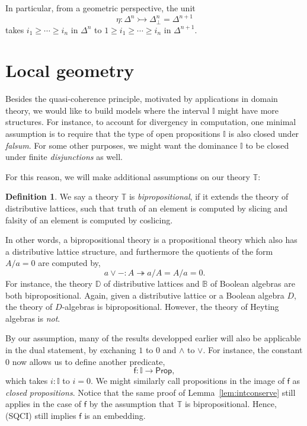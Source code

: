 \documentclass[12pt]{amsart}
\theoremstyle{definition}
\newtheorem{definition}[theorem]{Definition}
\newcommand{\mbb}[1]{\mathbb{#1}}
\newcommand{\T}{\mbb T}
\newcommand{\I}{\mbb I}
\newcommand{\ms}[1]{\mathsf{#1}}
\newcommand{\surj}{\twoheadrightarrow}
\newcommand{\inj}{\rightarrowtail}
\newcommand{\prt}{_{\bot}}
\newcommand{\pp}{\ms{Prop}}
\begin{document}
In particular, from a geometric perspective, the unit
\[ \eta : \Delta^n \inj \Delta^n\prt = \Delta^{n+1} \]
takes $i_1 \ge \cdots \ge i_n$ in $\Delta^n$ to $1 \ge i_1 \ge \cdots \ge i_n$ in $\Delta^{n+1}$. 

\section{Local geometry}\label{sec:nullstellensatz_and_local_geometry}

Besides the quasi-coherence principle, motivated by applications in domain theory, we would like to build models where the interval $\I$ might have more structures. For instance, to account for divergency in computation, one minimal assumption is to require that the type of open propositions $\I$ is also closed under \emph{falsum}. For some other purposes, we might want the dominance $\I$ to be closed under finite \emph{disjunctions} as well.

For this reason, we will make additional assumptions on our theory $\T$:

\begin{definition}
  We say a theory $\T$ is \emph{bipropositional}, if it extends the theory of distributive lattices, such that truth of an element is computed by slicing and falsity of an element is computed by coslicing.
\end{definition}

In other words, a bipropositional theory is a propositional theory which also has a distributive lattice structure, and furthermore the quotients of the form $A/a=0$ are computed by,
\[ a \vee - : A \surj a/A = A/a=0. \]
For instance, the theory $\mbb D$ of distributive lattices and $\mbb B$ of Boolean algebras are both bipropositional. Again, given a distributive lattice or a Boolean algebra $D$, the theory of $D$-algebras is bipropositional. However, the theory of Heyting algebras is \emph{not}. 

By our assumption, many of the results developped earlier will also be applicable in the dual statement, by exchaning $1$ to $0$ and $\wedge$ to $\vee$. For instance, the constant $0$ now allows us to define another predicate,
\[ \ms f : \I \to \pp, \]
which takes $i : \I$ to $i = 0$. We might similarly call propositions in the image of $\ms f$ as \emph{closed propositions}. Notice that the same proof of Lemma~\ref{lem:intconserve} still applies in the case of $\ms f$ by the assumption that $\T$ is bipropositional. Hence, (SQCI) still implies $\ms f$ is an embedding.
\end{document}
